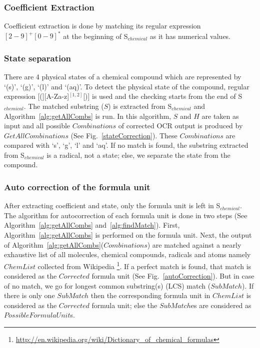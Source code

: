 \documentclass[conference]{IEEEtran}
\begin{document}
\subsubsection{Coefficient Extraction}
Coefficient extraction is done by matching its regular expression $[2-9]^{+}[0-9]^{*}$ at the beginning of S$_{chemical}$ as it has numerical values. 
\subsubsection{State separation}
 There are 4 physical states of a chemical compound which are represented by `(s)', `(g)', `(l)' and `(aq)'. To detect the physical state of the compound,  regular expression [(][A-Za-z]$^{[1,2]}$[)] is used and the checking starts from the end of S$_{chemical}$. The matched substring ($S$) is extracted from  S$_{chemical}$ and Algorithm~\ref{alg:getAllCombs} is run. 
In this algorithm, $S$ and $H$  are taken as input and all possible $Combinations$ of corrected OCR output is produced by $GetAllCombinations$ (See Fig.~\ref{stateCorrection}). These $Combinations$ are compared with `s', `g', `l' and `aq'. If no match is found, the substring extracted from S$_{chemical}$ is a radical, not a state; else, we separate the state from the compound. 

\subsubsection{Auto correction of the formula unit}
After extracting coefficient and state, only the formula unit is left in S$_{chemical}$. 
The algorithm for autocorrection of each formula unit is done in two steps (See Algorithm~\ref{alg:getAllCombs} and~\ref{alg:findMatch}). First, Algorithm~\ref{alg:getAllCombs} is performed on the formula unit.
 Next, the output of Algorithm~\ref{alg:getAllCombs}($Combinations$) are matched against a nearly exhaustive list of all molecules, chemical compounds, radicals and atoms namely $ChemList$ collected from Wikipedia \footnote{\url{http://en.wikipedia.org/wiki/Dictionary_of_chemical_formulas}}.
If a perfect match is found, that match is considered as the $Corrected$ formula unit (See Fig.~\ref{autoCorrection}). But in case of no match, we go for
longest common substring(s) (LCS) match ($SubMatch$).%
If there is only one $SubMatch$ then the corresponding formula unit in $ChemList$ is considered as the $Corrected$  formula unit; else the $SubMatch$es are considered as $PossibleFormulaUnit$s. 
\end{document}
